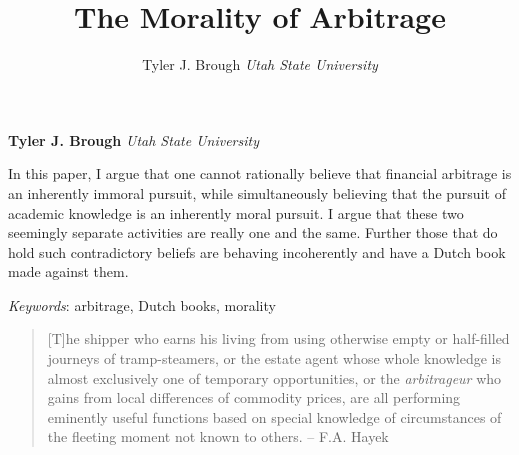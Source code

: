 \documentclass[11pt,]{article}
\title{The Morality of Arbitrage  }
\author{\Large Tyler J. Brough\vspace{0.05in} \newline\normalsize\emph{Utah State University}  }
\date{}
\newcommand*{\authorfont}{\fontfamily{phv}\selectfont}
\renewenvironment{abstract}
 {{%
    \setlength{\leftmargin}{0mm}
    \setlength{\rightmargin}{\leftmargin}%
  }%
  \relax}
 {\endlist}
\begin{document}
	
%

{%
\setlength{\parindent}{0pt}
\thispagestyle{plain}
{\fontsize{18}{20}\selectfont\raggedright 
\maketitle  %

}

{
   \vskip 13.5pt\relax \normalsize\fontsize{11}{12} 
\textbf{\authorfont Tyler J. Brough} \hskip 15pt \emph{\small Utah State University}   

}

}







\begin{abstract}

    \hbox{\vrule height .2pt width 39.14pc}

    \vskip 8.5pt %

\noindent In this paper, I argue that one cannot rationally believe that financial
arbitrage is an inherently immoral pursuit, while simultaneously
believing that the pursuit of academic knowledge is an inherently moral
pursuit. I argue that these two seemingly separate activities are really
one and the same. Further those that do hold such contradictory beliefs
are behaving incoherently and have a Dutch book made against them.


\vskip 8.5pt \noindent \emph{Keywords}: arbitrage, Dutch books, morality \par

    \hbox{\vrule height .2pt width 39.14pc}



\end{abstract}


\vskip 6.5pt

\noindent \doublespacing \begin{quote}
{[}T{]}he shipper who earns his living from using otherwise empty or
half-filled journeys of tramp-steamers, or the estate agent whose whole
knowledge is almost exclusively one of temporary opportunities, or the
\emph{arbitrageur} who gains from local differences of commodity prices,
are all performing eminently useful functions based on special knowledge
of circumstances of the fleeting moment not known to others. -- F.A.
Hayek
\end{quote}
\end{document}
